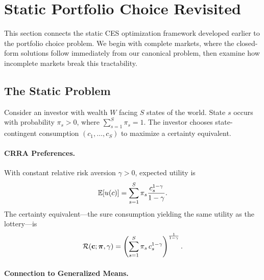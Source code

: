 


\section{Static Portfolio Choice Revisited}
\label{sec:static-portfolio}

This section connects the static CES optimization framework developed earlier to the portfolio choice problem. We begin with complete markets, where the closed-form solutions follow immediately from our canonical problem, then examine how incomplete markets break this tractability.

\subsection{The Static Problem}
\label{subsec:static-problem}

Consider an investor with wealth $W$ facing $S$ states of the world. State $s$ occurs with probability $\pi_s > 0$, where $\sum_{s=1}^{S} \pi_s = 1$. The investor chooses state-contingent consumption $(c_1, \ldots, c_S)$ to maximize a certainty equivalent.

\paragraph{CRRA Preferences.}

With constant relative risk aversion $\gamma > 0$, expected utility is
\begin{equation}
\mathbb{E}[u(c)] = \sum_{s=1}^{S} \pi_s \frac{c_s^{1-\gamma}}{1-\gamma}.
\label{eq:expected-utility}
\end{equation}
The certainty equivalent---the sure consumption yielding the same utility as the lottery---is
\begin{equation}
\mathcal{R}(\mathbf{c}; \bm{\pi}, \gamma) = \left( \sum_{s=1}^{S} \pi_s \, c_s^{1-\gamma} \right)^{\frac{1}{1-\gamma}}.
\label{eq:certainty-equivalent}
\end{equation}

\paragraph{Connection to Generalized Means.}

